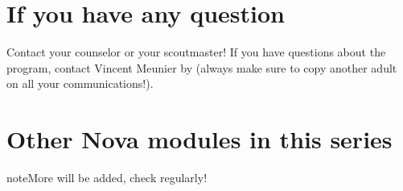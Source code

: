 \documentclass[letterpaper,10pt,english,openany,oneside]{sphinxmanual}
\begin{document}
\section{If you have any question}
\label{\detokenize{introduction:if-you-have-any-question}}
Contact your counselor or your scoutmaster! If you have questions about the program, contact Vincent Meunier by  (always make sure to copy another adult on all your communications!).


\section{Other Nova modules in this series}
\label{\detokenize{introduction:other-nova-modules-in-this-series}}
\begin{sphinxadmonition}{note}{More will be added, check regularly!}



\end{sphinxadmonition}
\end{document}
